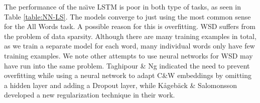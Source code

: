 			




The performance of the na\"{\i}ve LSTM is poor in both type of tasks, as seen in Table
\ref{table:NN-LS}. The models converge to just
using the most common sense for the All Words task. A possible reason for this is overfitting. WSD suffers
from the problem of data sparsity. Although there are many training
examples in total, as we train a separate model for each word, many
individual words only have few training examples. We note other attempts to use neural networks for WSD may have run into the same problem. Taghipour \& Ng  indicated the need to prevent overfitting while using a neural network to adapt C\&W embeddings by omitting a hidden layer and adding a Dropout layer, while K{\aa}geb{\"a}ck \& Salomonsson  developed a new regularization technique in their work.
